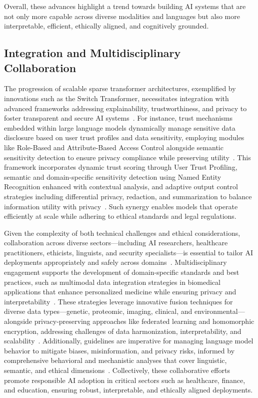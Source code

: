 \documentclass[sigconf]{acmart}
\begin{document}
Overall, these advances highlight a trend towards building AI systems that are not only more capable across diverse modalities and languages but also more interpretable, efficient, ethically aligned, and cognitively grounded.

\subsection{Integration and Multidisciplinary Collaboration}

The progression of scalable sparse transformer architectures, exemplified by innovations such as the Switch Transformer, necessitates integration with advanced frameworks addressing explainability, trustworthiness, and privacy to foster transparent and secure AI systems~\cite{ref14}. For instance, trust mechanisms embedded within large language models dynamically manage sensitive data disclosure based on user trust profiles and data sensitivity, employing modules like Role-Based and Attribute-Based Access Control alongside semantic sensitivity detection to ensure privacy compliance while preserving utility~\cite{ref11}. This framework incorporates dynamic trust scoring through User Trust Profiling, semantic and domain-specific sensitivity detection using Named Entity Recognition enhanced with contextual analysis, and adaptive output control strategies including differential privacy, redaction, and summarization to balance information utility with privacy~\cite{ref11}. Such synergy enables models that operate efficiently at scale while adhering to ethical standards and legal regulations.

Given the complexity of both technical challenges and ethical considerations, collaboration across diverse sectors—including AI researchers, healthcare practitioners, ethicists, linguists, and security specialists—is essential to tailor AI deployments appropriately and safely across domains~\cite{ref11,ref12,ref14,ref34}. Multidisciplinary engagement supports the development of domain-specific standards and best practices, such as multimodal data integration strategies in biomedical applications that enhance personalized medicine while ensuring privacy and interpretability~\cite{ref12}. These strategies leverage innovative fusion techniques for diverse data types—genetic, proteomic, imaging, clinical, and environmental—alongside privacy-preserving approaches like federated learning and homomorphic encryption, addressing challenges of data harmonization, interpretability, and scalability~\cite{ref12}. Additionally, guidelines are imperative for managing language model behavior to mitigate biases, misinformation, and privacy risks, informed by comprehensive behavioral and mechanistic analyses that cover linguistic, semantic, and ethical dimensions~\cite{ref34}. Collectively, these collaborative efforts promote responsible AI adoption in critical sectors such as healthcare, finance, and education, ensuring robust, interpretable, and ethically aligned deployments.
\end{document}
